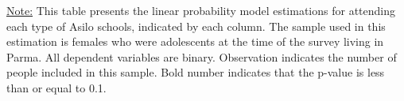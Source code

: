 \begin{footnotesize}
\noindent\underline{Note:} This table presents the linear probability model estimations for attending each type of Asilo schools, indicated by each column. The sample used in this estimation is females who were adolescents at the time of the survey living in Parma. All dependent variables are binary. Observation indicates the number of people included in this sample. Bold number indicates that the p-value is less than or equal to 0.1.
\end{footnotesize}
